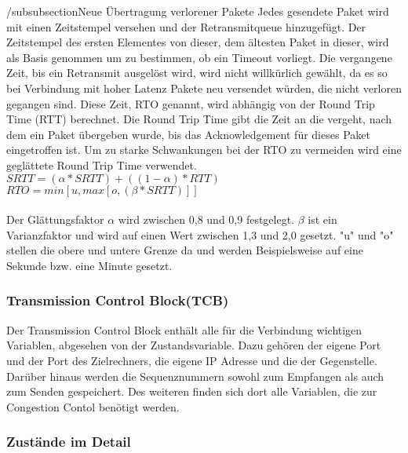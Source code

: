 /subsubsection{Neue Übertragung verlorener Pakete}
Jedes gesendete Paket wird mit einen Zeitstempel versehen und der Retransmitqueue hinzugefügt. Der Zeitstempel des ersten Elementes von dieser, dem ältesten Paket in dieser, wird als Basis genommen um zu bestimmen, ob ein Timeout vorliegt. Die vergangene Zeit, bis ein Retransmit ausgelöst wird, wird nicht willkürlich gewählt, da es so bei Verbindung mit hoher Latenz Pakete neu versendet würden, die nicht verloren gegangen sind. Diese Zeit, RTO genannt, wird abhängig von der Round Trip Time (RTT) berechnet. Die Round Trip Time gibt die Zeit an die vergeht, nach dem ein Paket übergeben wurde, bis das Acknowledgement für dieses Paket eingetroffen ist.  Um zu starke Schwankungen bei der RTO zu vermeiden wird eine geglättete Round Trip Time verwendet. \\
$SRTT = (\alpha * SRTT) + ((1-\alpha)*RTT)$\\
$RTO = min [u, max [o, (\beta *SRTT)]]$\\\\
Der Glättungsfaktor $\alpha$ wird zwischen 0,8 und 0,9 festgelegt. $\beta$ ist ein Varianzfaktor und wird auf einen Wert zwischen 1,3 und 2,0 gesetzt. {}"u"{} und {}"o"{} stellen die obere und untere Grenze da und werden Beispielsweise auf eine Sekunde bzw. eine Minute gesetzt.


\subsubsection{Transmission Control Block(TCB)}

Der Transmission Control Block enthält alle für die Verbindung wichtigen Variablen, abgesehen von der Zustandsvariable.  Dazu gehören der eigene Port und der Port des Zielrechners, die eigene IP Adresse und die der Gegenstelle. Darüber hinaus werden die Sequenznummern sowohl zum Empfangen als auch zum Senden gespeichert.  Des weiteren finden sich dort alle Variablen, die zur Congestion Contol benötigt werden.  


\subsubsection{Zustände im Detail}

